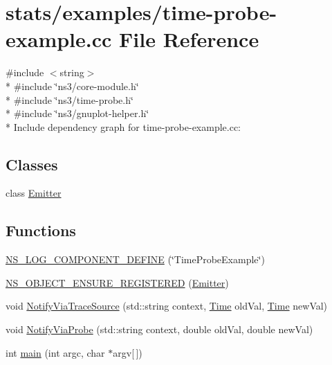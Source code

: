 \hypertarget{time-probe-example_8cc}{}\section{stats/examples/time-\/probe-\/example.cc File Reference}
\label{time-probe-example_8cc}
{\ttfamily \#include $<$string$>$}\\*
{\ttfamily \#include \char`\"{}ns3/core-\/module.\+h\char`\"{}}\\*
{\ttfamily \#include \char`\"{}ns3/time-\/probe.\+h\char`\"{}}\\*
{\ttfamily \#include \char`\"{}ns3/gnuplot-\/helper.\+h\char`\"{}}\\*
Include dependency graph for time-\/probe-\/example.cc\+:
\subsection*{Classes}
\begin{DoxyCompactItemize}
\item 
class \hyperlink{classEmitter}{Emitter}
\end{DoxyCompactItemize}
\subsection*{Functions}
\begin{DoxyCompactItemize}
\item 
\hyperlink{time-probe-example_8cc_ac9e97608181525dacc4f242a38c30ae4}{N\+S\+\_\+\+L\+O\+G\+\_\+\+C\+O\+M\+P\+O\+N\+E\+N\+T\+\_\+\+D\+E\+F\+I\+NE} (\char`\"{}Time\+Probe\+Example\char`\"{})
\item 
\hyperlink{time-probe-example_8cc_a02543ef64adac04c3ef2c7c137ee4d9f}{N\+S\+\_\+\+O\+B\+J\+E\+C\+T\+\_\+\+E\+N\+S\+U\+R\+E\+\_\+\+R\+E\+G\+I\+S\+T\+E\+R\+ED} (\hyperlink{classEmitter}{Emitter})
\item 
void \hyperlink{time-probe-example_8cc_ad814e60140a70993531da0fd84afe604}{Notify\+Via\+Trace\+Source} (std\+::string context, \hyperlink{classns3_1_1Time}{Time} old\+Val, \hyperlink{classns3_1_1Time}{Time} new\+Val)
\item 
void \hyperlink{time-probe-example_8cc_a2b89eb6cf8dc830f27ce00766bf62c68}{Notify\+Via\+Probe} (std\+::string context, double old\+Val, double new\+Val)
\item 
int \hyperlink{time-probe-example_8cc_a0ddf1224851353fc92bfbff6f499fa97}{main} (int argc, char $\ast$argv\mbox{[}$\,$\mbox{]})
\end{DoxyCompactItemize}
